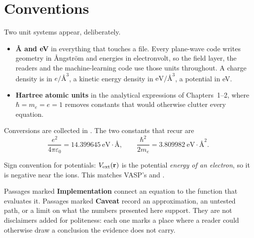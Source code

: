 \section*{Conventions}

Two unit systems appear, deliberately.

\begin{itemize}
  \item \textbf{Å and eV} in everything that touches a file. Every plane-wave
    code writes geometry in Ångström and energies in electronvolt, so the field
    layer, the readers and the machine-learning code use those units
    throughout. A charge density is in $e/\text{\AA}^3$, a kinetic energy
    density in $\mathrm{eV}/\text{\AA}^3$, a potential in eV.
  \item \textbf{Hartree atomic units} in the analytical expressions of
    Chapters~1--2, where $\hbar = m_e = e = 1$ removes constants that would
    otherwise clutter every equation.
\end{itemize}

Conversions are collected in . The two
constants that recur are
\[
  \frac{e^2}{4\pi\varepsilon_0} = 14.399645\ \mathrm{eV}\cdot\text{\AA},
  \qquad
  \frac{\hbar^2}{2m_e} = 3.809982\ \mathrm{eV}\cdot\text{\AA}^2 .
\]

Sign convention for potentials: $V_{\mathrm{ext}}(\mathbf{r})$ is the potential \emph{energy of an
electron}, so it is negative near the ions. This matches VASP's 
and .

\begin{pnote}
Passages marked \textbf{Implementation} connect an equation to the function
that evaluates it. Passages marked \textbf{Caveat} record an approximation, an
untested path, or a limit on what the numbers presented here support. They are
not disclaimers added for politeness: each one marks a place where a reader
could otherwise draw a conclusion the evidence does not carry.
\end{pnote}
